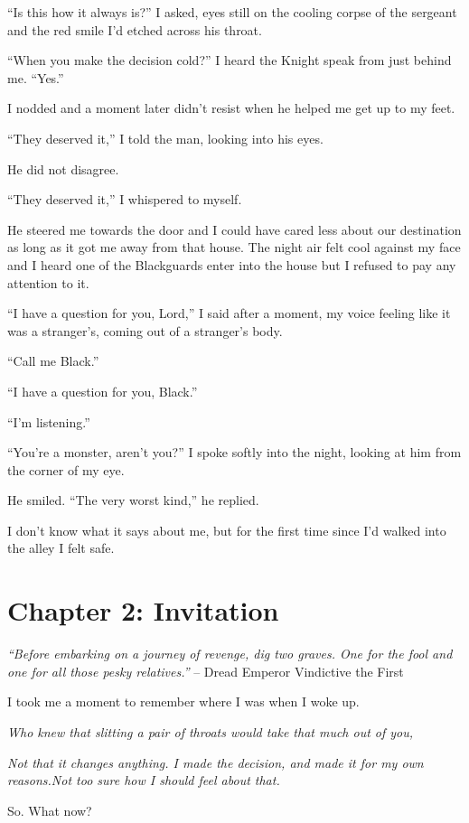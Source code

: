 \documentclass[12pt, openany]{book}
\begin{document}
“Is this how it always is?” I asked, eyes still on the cooling corpse of the sergeant and the red smile I’d etched across his throat.

“When you make the decision cold?” I heard the Knight speak from just behind me. “Yes.”

I nodded and a moment later didn’t resist when he helped me get up to my feet.

“They deserved it,” I told the man, looking into his eyes.

He did not disagree.

“They deserved it,” I whispered to myself.

He steered me towards the door and I could have cared less about our destination as long as it got me away from that house. The night air felt cool against my face and I heard one of the Blackguards enter into the house but I refused to pay any attention to it.

“I have a question for you, Lord,” I said after a moment, my voice feeling like it was a stranger’s, coming out of a stranger’s body.

“Call me Black.”

“I have a question for you, Black.”

“I’m listening.”

“You’re a monster, aren’t you?” I spoke softly into the night, looking at him from the corner of my eye.

He smiled. “The very worst kind,” he replied.

I don’t know what it says about me, but for the first time since I’d walked into the alley I felt safe.
\clearpage
\chapter{Chapter 2: Invitation}

\textit{“Before embarking on a journey of revenge, dig two graves. One for the fool and one for all those pesky relatives.”}
– Dread Emperor Vindictive the First

I took me a moment to remember where I was when I woke up. 

\textit{Who knew that slitting a pair of throats would take that much out of you,}

\textit{Not that it changes anything. I made the decision, and made it for my own reasons.}\textit{Not too sure how I should feel about that.}

So. What now? 
\end{document}
